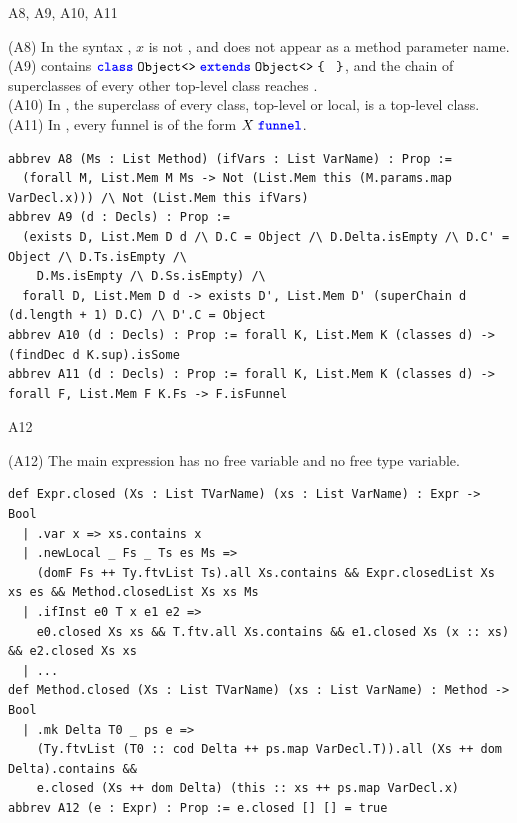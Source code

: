 \begin{cmp}{A8, A9, A10, A11}
\begin{paperside}
(A8) In the syntax , $x$ is not \Q@this@, and \Q@this@ does not appear as a method parameter name.\\
(A9) \decls contains $\subclass{\Object}{}{\Object}{}{}{}$, and the chain of superclasses of every other top-level class reaches \Q@Object@.\\
(A10) In \decls, the superclass of every class, top-level or local, is a top-level class.\\
(A11) In \decls, every funnel is of the form $X\mskip5mu\text{\ttfamily\bfseries\color{blue}funnel}$.
\end{paperside}
\begin{leanside}
\begin{lstlisting}[style=leanside]
abbrev A8 (Ms : List Method) (ifVars : List VarName) : Prop :=
  (forall M, List.Mem M Ms -> Not (List.Mem this (M.params.map VarDecl.x))) /\ Not (List.Mem this ifVars)
abbrev A9 (d : Decls) : Prop :=
  (exists D, List.Mem D d /\ D.C = Object /\ D.Delta.isEmpty /\ D.C' = Object /\ D.Ts.isEmpty /\
    D.Ms.isEmpty /\ D.Ss.isEmpty) /\
  forall D, List.Mem D d -> exists D', List.Mem D' (superChain d (d.length + 1) D.C) /\ D'.C = Object
abbrev A10 (d : Decls) : Prop := forall K, List.Mem K (classes d) -> (findDec d K.sup).isSome
abbrev A11 (d : Decls) : Prop := forall K, List.Mem K (classes d) -> forall F, List.Mem F K.Fs -> F.isFunnel
\end{lstlisting}
\end{leanside}
\end{cmp}

\begin{cmp}{A12}
\begin{paperside}
(A12) The main expression has no free variable and no free type variable.
\end{paperside}
\begin{leanside}
\begin{lstlisting}[style=leanside]
def Expr.closed (Xs : List TVarName) (xs : List VarName) : Expr -> Bool
  | .var x => xs.contains x
  | .newLocal _ Fs _ Ts es Ms =>
    (domF Fs ++ Ty.ftvList Ts).all Xs.contains && Expr.closedList Xs xs es && Method.closedList Xs xs Ms
  | .ifInst e0 T x e1 e2 =>
    e0.closed Xs xs && T.ftv.all Xs.contains && e1.closed Xs (x :: xs) && e2.closed Xs xs
  | ...
def Method.closed (Xs : List TVarName) (xs : List VarName) : Method -> Bool
  | .mk Delta T0 _ ps e =>
    (Ty.ftvList (T0 :: cod Delta ++ ps.map VarDecl.T)).all (Xs ++ dom Delta).contains &&
    e.closed (Xs ++ dom Delta) (this :: xs ++ ps.map VarDecl.x)
abbrev A12 (e : Expr) : Prop := e.closed [] [] = true
\end{lstlisting}
\end{leanside}
\end{cmp}

